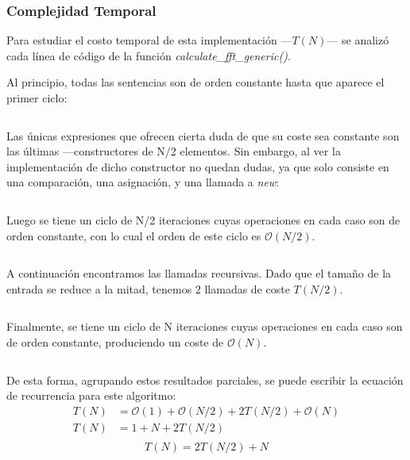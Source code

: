 \documentclass{article}
\begin{document}
    \subsubsection{Complejidad Temporal}
      Para estudiar el costo temporal de esta implementación ---$T(N)$--- se analizó
    cada línea de código de la función \textit{calculate\_fft\_generic()}.\par
    Al principio, todas las sentencias son de orden constante hasta que
    aparece el primer ciclo:
    \begin{lstlisting}
    \end{lstlisting}
      Las únicas expresiones que ofrecen cierta duda de que su coste sea 
    constante son las últimas ---constructores de N/2 elementos. Sin embargo,
    al ver la implementación de dicho constructor no quedan dudas, ya que solo
    consiste en una comparación, una asignación, y una llamada a \textit{new}:
    \begin{lstlisting}
    \end{lstlisting}
      Luego se tiene un ciclo de N/2 iteraciones cuyas operaciones en cada caso
    son de orden constante, con lo cual el orden de este ciclo es $\mathcal{O}(N/2)$.
    \begin{lstlisting}
    \end{lstlisting}
      A continuación encontramos las llamadas recursivas. Dado que el tamaño
     de la entrada se reduce a la mitad, tenemos 2 llamadas de coste $T(N/2)$.
    \begin{lstlisting}
    \end{lstlisting}
      Finalmente, se tiene un ciclo de N iteraciones cuyas operaciones en cada 
    caso son de orden constante, produciendo un coste de $\mathcal{O}(N)$.
    \begin{lstlisting}
    \end{lstlisting}
      De esta forma, agrupando estos resultados parciales, se puede escribir la
     ecuación de recurrencia para este algoritmo:
    \begin{align*}
      T(N) &= \mathcal{O}(1) + \mathcal{O}(N/2) + 2T(N/2) + \mathcal{O}(N) \\
      T(N) &= 1 + N + 2T(N/2) \\
    \end{align*}
    \begin{equation*}
      \boxed{T(N) = 2T(N/2) + N}
    \end{equation*}
\end{document}
